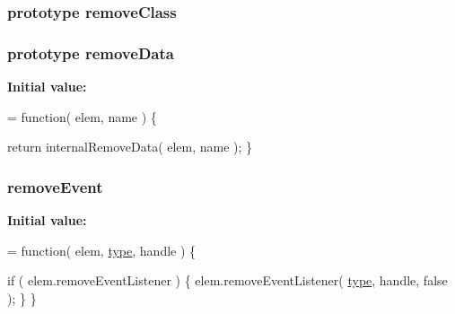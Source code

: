 \subsubsection[{remove\+Class}]{ {\bf prototype} remove\+Class}\label{jquery-1_810_82-vsdoc_8js_a7cb7158f409485c170580c2afea3e234}
\hypertarget{jquery-1_810_82-vsdoc_8js_a4da6cd95c6aa2933e1fc145392d22460}{}
\subsubsection[{remove\+Data}]{ {\bf prototype} remove\+Data}\label{jquery-1_810_82-vsdoc_8js_a4da6cd95c6aa2933e1fc145392d22460}
{\bfseries Initial value\+:}
\begin{DoxyCode}
= \textcolor{keyword}{function}( elem, name ) \{


        \textcolor{keywordflow}{return} internalRemoveData( elem, name );
    \}
\end{DoxyCode}
\hypertarget{jquery-1_810_82-vsdoc_8js_aa1c5d81df6a0efc8b733d7df6f1faffd}{}
\subsubsection[{remove\+Event}]{ remove\+Event}\label{jquery-1_810_82-vsdoc_8js_aa1c5d81df6a0efc8b733d7df6f1faffd}
{\bfseries Initial value\+:}
\begin{DoxyCode}
= \textcolor{keyword}{function}( elem, \hyperlink{jquery-1_810_82-vsdoc_8js_a3940565e83a9bfd10d95ffd27536da91}{type}, handle ) \{

        \textcolor{keywordflow}{if} ( elem.removeEventListener ) \{
            elem.removeEventListener( \hyperlink{jquery-1_810_82-vsdoc_8js_a3940565e83a9bfd10d95ffd27536da91}{type}, handle, \textcolor{keyword}{false} );
        \}
    \}
\end{DoxyCode}
\hypertarget{jquery-1_810_82-vsdoc_8js_a5f3c3bda90c5d61345bf87ec3eac6145}{}
